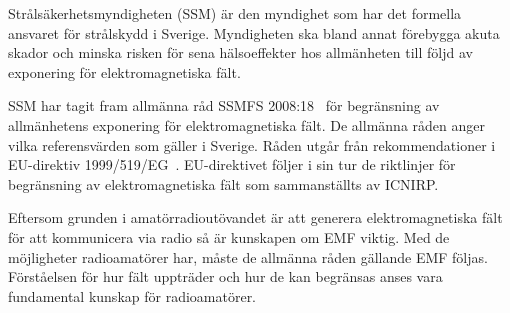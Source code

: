 Strålsäkerhetsmyndigheten (SSM) är den myndighet som har det formella ansvaret
för strålskydd i Sverige.
Myndigheten ska bland annat förebygga akuta skador och minska risken för sena
hälsoeffekter hos allmänheten till följd av exponering för elektromagnetiska
fält.

SSM har tagit fram allmänna råd SSMFS 2008:18~\cite{SSMFS2008:18} för
begränsning av allmänhetens exponering för elektromagnetiska fält.
De allmänna råden anger vilka referensvärden som gäller i Sverige.
Råden utgår från rekommendationer i EU-direktiv 1999/519/EG~\cite{1999/519/EG}.
EU-direktivet följer i sin tur de riktlinjer för begränsning av
elektromagnetiska fält som sammanställts av ICNIRP.

Eftersom grunden i amatörradioutövandet är att generera elektromagnetiska fält
för att kommunicera via radio så är kunskapen om EMF viktig.
Med de möjligheter radioamatörer har, måste de allmänna råden gällande EMF
följas.
Förståelsen för hur fält uppträder och hur de kan begränsas anses vara
fundamental kunskap för radioamatörer.
